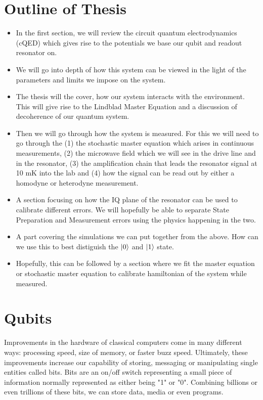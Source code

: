 \section{Outline of Thesis}
\begin{itemize}
    \item In the first section, we will review the circuit quantum electrodynamics (cQED) which gives rise to the potentials we base our qubit and readout resonator on.
    \item We will go into depth of how this system can be viewed in the light of the parameters and limits we impose on the system.
    \item The thesis will the cover, how our system interacts with the environment. This will give rise to the Lindblad Master Equation and a discussion of decoherence of our quantum system. 
    \item Then we will go through how the system is measured. For this we will need to go through the (1) the stochastic master equation which arises in continuous measurements, (2) the microwave field which we will see in the drive line and in the resonator, (3) the amplification chain that leads the resonator signal at 10 mK into the lab and (4) how the signal can be read out by either a homodyne or heterodyne measurement.
    \item A section focusing on how the IQ plane of the resonator can be used to calibrate different errors. We will hopefully be able to separate State Preparation and Measurement errors using the physics happening in the two.
    \item A part covering the simulations we can put together from the above. How can we use this to best distiguish the $\ket{0}$ and $\ket{1}$ state. 
    \item Hopefully, this can be followed by a section where we fit the master equation or stochastic master equation to calibrate hamiltonian of the system while measured.
\end{itemize}

\section{Qubits}
Improvements in the hardware of classical computers come in many different ways: processing speed, size of memory, or faster buzz speed. Ultimately, these improvements increase our capability of storing, messaging or manipulating single entities called bits. Bits are an on/off switch representing a small piece of information normally represented as either being "1" or "0". Combining billions or even trillions of these bits, we can store data, media or even programs.

